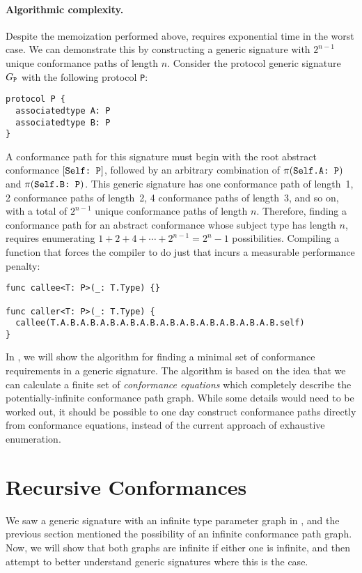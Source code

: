 \documentclass[../generics]{subfiles}
\begin{document}
\paragraph{Algorithmic complexity.}
Despite the memoization performed above,  requires exponential time in the worst case. We can demonstrate this by constructing a generic signature with $2^{n-1}$ unique conformance paths of length $n$. Consider the protocol generic signature $G_{\texttt{P}}$ with the following protocol \texttt{P}:
\begin{Verbatim}
protocol P {
  associatedtype A: P
  associatedtype B: P
}
\end{Verbatim}

A conformance path for this signature must begin with the root abstract conformance $[\texttt{Self:~P}]$, followed by an arbitrary combination of $\pi(\texttt{Self.A:~P})$ and $\pi(\texttt{Self.B:~P})$. This generic signature has one conformance path of length~1, 2 conformance paths of length~2, 4 conformance paths of length~3, and so on, with a total of $2^{n-1}$ unique conformance paths of length $n$. Therefore, finding a conformance path for an abstract conformance whose subject type has length $n$, requires enumerating $1+2+4+\cdots+2^{n-1}=2^n-1$ possibilities. Compiling a function that forces the compiler to do just that incurs a measurable performance penalty:
\begin{Verbatim}
func callee<T: P>(_: T.Type) {}

func caller<T: P>(_: T.Type) {
  callee(T.A.B.A.B.A.B.A.B.A.B.A.B.A.B.A.B.A.B.A.B.A.B.self)
}
\end{Verbatim}

In , we will show the algorithm for finding a minimal set of conformance requirements in a generic signature. The algorithm is based on the idea that we can calculate a finite set of \emph{conformance equations} which completely describe the potentially-infinite conformance path graph. While some details would need to be worked out, it should be possible to one day construct conformance paths directly from conformance equations, instead of the current approach of exhaustive enumeration.

\section{Recursive Conformances}\label{recursive conformances}

We saw a generic signature with an infinite type parameter graph in , and the previous section mentioned the possibility of an infinite conformance path graph. Now, we will show that both graphs are infinite if either one is infinite, and then attempt to better understand generic signatures where this is the case.
\end{document}
